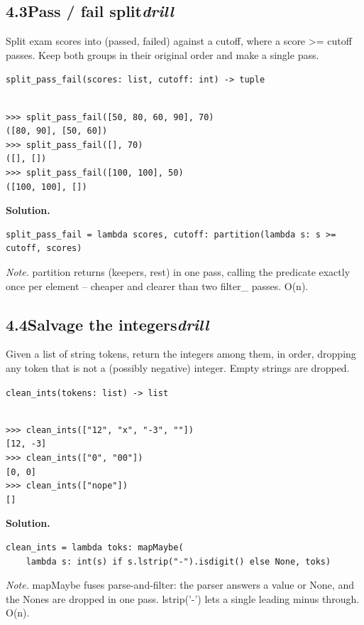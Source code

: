 \documentclass[10pt,letterpaper]{book}
\begin{document}
\subsection*{4.3\quad Pass / fail split\hfill\textnormal{\textit{drill}}}
Split exam scores into (passed, failed) against a cutoff, where a score >= cutoff passes. Keep both groups in their original order and make a single pass.

\noindent\texttt{split\_pass\_fail(scores: list, cutoff: int) -> tuple}
\begin{lstlisting}[style=ex]

>>> split_pass_fail([50, 80, 60, 90], 70)
([80, 90], [50, 60])
>>> split_pass_fail([], 70)
([], [])
>>> split_pass_fail([100, 100], 50)
([100, 100], [])

\end{lstlisting}
\noindent\textbf{Solution.}
\begin{lstlisting}[style=code]
split_pass_fail = lambda scores, cutoff: partition(lambda s: s >= cutoff, scores)
\end{lstlisting}
\noindent\textit{Note.} partition returns (keepers, rest) in one pass, calling the predicate exactly once per element -- cheaper and clearer than two filter\_ passes. O(n).

\subsection*{4.4\quad Salvage the integers\hfill\textnormal{\textit{drill}}}
Given a list of string tokens, return the integers among them, in order, dropping any token that is not a (possibly negative) integer. Empty strings are dropped.

\noindent\texttt{clean\_ints(tokens: list) -> list}
\begin{lstlisting}[style=ex]

>>> clean_ints(["12", "x", "-3", ""])
[12, -3]
>>> clean_ints(["0", "00"])
[0, 0]
>>> clean_ints(["nope"])
[]

\end{lstlisting}
\noindent\textbf{Solution.}
\begin{lstlisting}[style=code]
clean_ints = lambda toks: mapMaybe(
    lambda s: int(s) if s.lstrip("-").isdigit() else None, toks)
\end{lstlisting}
\noindent\textit{Note.} mapMaybe fuses parse-and-filter: the parser answers a value or None, and the Nones are dropped in one pass. lstrip('-') lets a single leading minus through. O(n).
\end{document}
